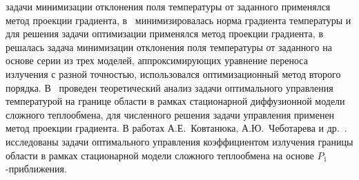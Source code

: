     задачи минимизации отклонения поля температуры от заданного применялся
    метод проекции градиента, в~\cite{clever2012optimal, Pinnau2004} минимизировалась норма градиента
    температуры и для решения задачи оптимизации применялся метод проекции
    градиента, в~\cite{clever2014model} решалась задача минимизации отклонения поля
    температуры от заданного на основе серии из трех моделей,
    аппроксимирующих уравнение переноса излучения с разной точностью,
    использовался оптимизационный метод второго порядка.
    В~\cite{Pinnau2004} проведен
    теоретический анализ задачи оптимального управления температурой на
    границе области в рамках стационарной диффузионной модели сложного
    теплообмена, для численного решения задачи управления применен метод
    проекции градиента.
    В работах А.Е.\ Ковтанюка, А.Ю.\ Чеботарева и др.\ \cite{Kovtanyuk2014,
        Mesenev2018, astrakhantseva2017design, Chebotarev2015,
        Kovtanyuk2014TheoreticalAnalysis}.
    исследованы задачи оптимального
    управления коэффициентом излучения границы области в рамках
    стационарной модели сложного теплообмена на основе $P_1$-приближения.


